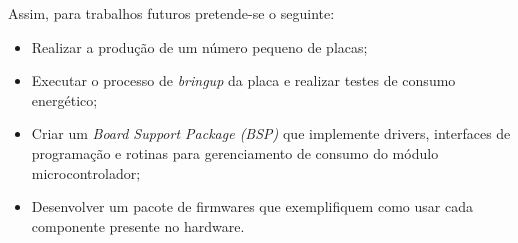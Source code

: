 Assim, para trabalhos futuros pretende-se o seguinte:

\begin{itemize}
    \item Realizar a produção de um número pequeno de placas;
    \item Executar o processo de \textit{bringup} da placa e realizar testes de consumo energético;
    \item Criar um \textit{Board Support Package (BSP)} que implemente drivers, interfaces de programação e rotinas para gerenciamento de consumo do módulo microcontrolador;
    \item Desenvolver um pacote de firmwares que exemplifiquem como usar cada componente presente no hardware.
\end{itemize}


\fi














